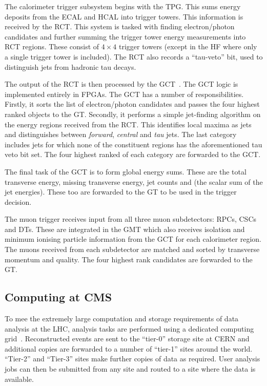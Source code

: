 The calorimeter trigger subsystem begins with the \ac{TPG}. This sums energy
deposits from the \ac{ECAL} and \ac{HCAL} into trigger towers. This information
is received by the \ac{RCT}. This system is tasked with finding electron/photon
candidates and further summing the trigger tower energy measurements into
\ac{RCT} regions. These consist of $4\times 4$ trigger towers (except in the
\ac{HF} where only a single trigger tower is included). The \ac{RCT} also
records a ``tau-veto'' bit, used to distinguish jets from hadronic tau decays.

The output of the \ac{RCT} is then processed by the
\ac{GCT}~\cite{jj_thesis}. The \ac{GCT} logic is implemented entirely in
\acp{FPGA}. The \ac{GCT} has a number of responsibilities. Firstly, it sorts the
list of electron/photon candidates and passes the four highest ranked objects to
the \ac{GT}. Secondly, it performs a simple jet-finding algorithm on the energy
regions received from the \ac{RCT}. This identifies local maxima as jets and
distinguishes between \emph{forward}, \emph{central} and \emph{tau} jets. The
last category includes jets for which none of the constituent regions has the
aforementioned tau veto bit set. The four highest ranked of each category are
forwarded to the \ac{GCT}.

The final task of the \ac{GCT} is to form global energy sums. These are the
total transverse energy, missing transverse energy, jet counts and \HT (the
scalar sum of the jet energies). These too are forwarded to the \ac{GT} to be
used in the trigger decision.

The muon trigger receives input from all three muon subdetectors: \acp{RPC},
\acp{CSC} and \acp{DT}. These are integrated in the \ac{GMT} which also receives
isolation and minimum ionising particle information from the \ac{GCT} for each
calorimeter region. The muons received from each subdetector are matched and
sorted by transverse momentum and quality. The four highest rank candidates are
forwarded to the \ac{GT}.

\subsection{Computing at \ac{CMS}}
\label{sec:cms_computing}
To mee the extremely large computation and storage requirements of data analysis
at the \ac{LHC}, analysis tasks are performed using a dedicated computing
grid~\cite{lhc_grid}. Reconstructed events are sent to the ``tier-0'' storage
site at \ac{CERN} and additional copies are forwarded to a number of ``tier-1''
sites around the world. ``Tier-2'' and ``Tier-3'' sites make further copies of
data as required. User analysis jobs can then be submitted from any site and
routed to a site where the data is available.

